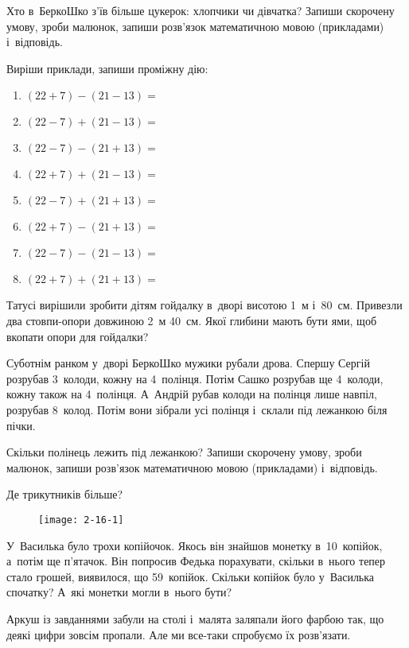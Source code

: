 Хто в~БеркоШко з’їв більше цукерок: хлопчики чи дівчатка?
Запиши скорочену умову, зроби малюнок, запиши розв’язок
математичною мовою (прикладами) і~відповідь.


\problem
Виріши приклади, запиши проміжну дію:
\begin{multicols}{2}
  \begin{enumerate}
    \item $(22 + 7) - (21 - 13) =$
    \item $(22 - 7) + (21 - 13) =$
    \item $(22 - 7) - (21 + 13) =$
    \item $(22 + 7) + (21 - 13) =$
    \item $(22 - 7) + (21 + 13) =$
    \item $(22 + 7) - (21 + 13) =$
    \item $(22 - 7) - (21 - 13) =$
    \item $(22 + 7) + (21 + 13) =$
  \end{enumerate}
\end{multicols}


\problem
Татусі вирішили зробити дітям гойдалку в~дворі висотою 1~м і~80~см.
Привезли два стовпи-опори довжиною 2~м 40~см.
Якої глибини мають бути ями, щоб вкопати опори для гойдалки?


\problem
Суботнім ранком у~дворі БеркоШко мужики рубали дрова.
Спершу Сергій розрубав 3~колоди, кожну на 4~полінця.
Потім Сашко розрубав ще 4~колоди, кожну також на 4~полінця.
А~Андрій рубав колоди на полінця лише навпіл, розрубав 8~колод.
Потім вони зібрали усі полінця і~склали під лежанкою біля пічки.

Скільки полінець лежить під лежанкою?
Запиши скорочену умову, зроби малюнок,
запиши розв’язок математичною мовою (прикладами) і~відповідь.


\problem
Де трикутників більше?

\begin{figure}[ht]
  \centering
  \texttt{[image: 2-16-1]}
\end{figure}


\problem
У~Василька було трохи копійочок.
Якось він знайшов монетку в~10~копійок, а~потім ще п’ятачок.
Він попросив Федька порахувати, скільки в~нього тепер стало грошей,
виявилося, що 59~копійок.
Скільки копійок було у~Василька спочатку?
А~які монетки могли в~нього бути?


\problem
Аркуш із завданнями забули на столі і~малята заляпали його фарбою так,
що деякі цифри зовсім пропали.
Але ми все-таки спробуємо їх розв’язати.


